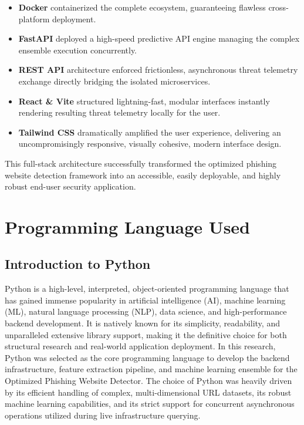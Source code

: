 \begin{itemize}
\item \textbf{Docker} containerized the complete ecosystem, guaranteeing flawless cross-platform deployment.
\item \textbf{FastAPI} deployed a high-speed predictive API engine managing the complex ensemble execution concurrently.
\item \textbf{REST API} architecture enforced frictionless, asynchronous threat telemetry exchange directly bridging the isolated microservices.
\item \textbf{React \& Vite} structured lightning-fast, modular interfaces instantly rendering resulting threat telemetry locally for the user.
\item \textbf{Tailwind CSS} dramatically amplified the user experience, delivering an uncompromisingly responsive, visually cohesive, modern interface design.
\end{itemize}
\noindent
This full-stack architecture successfully transformed the optimized phishing website detection framework into an accessible, easily deployable, and highly robust end-user security application.

\section{Programming Language Used}

\subsection{Introduction to Python}
\noindent
Python is a high-level, interpreted, object-oriented programming language that has gained immense popularity in artificial intelligence (AI), machine learning (ML), natural language processing (NLP), data science, and high-performance backend development. It is natively known for its simplicity, readability, and unparalleled extensive library support, making it the definitive choice for both structural research and real-world application deployment.
\noindent
In this research, Python was selected as the core programming language to develop the backend infrastructure, feature extraction pipeline, and machine learning ensemble for the Optimized Phishing Website Detector. The choice of Python was heavily driven by its efficient handling of complex, multi-dimensional URL datasets, its robust machine learning capabilities, and its strict support for concurrent asynchronous operations utilized during live infrastructure querying.

